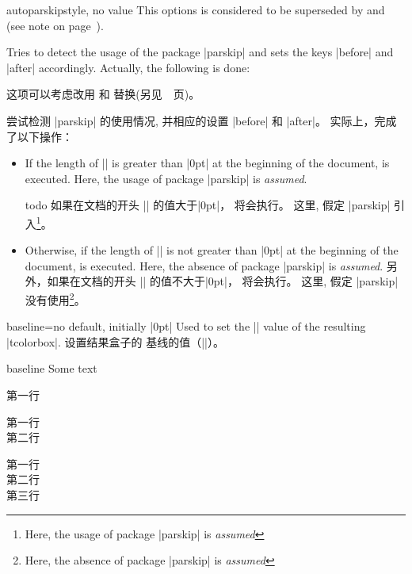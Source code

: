 \begin{docTcbKey}{autoparskip}{}{style, no value}
This options is considered to be superseded by
 and 
(see note on page~\pageref{subsec:surroundings}).\par
Tries to detect the usage of the package |parskip| and sets
the keys |before| and |after| accordingly. Actually, the following is done:

这项可以考虑改用  和  替换(另见~\pageref{subsec:surroundings}~页)。\par
尝试检测 |parskip| 的使用情况, 并相应的设置 |before| 和 |after|。 实际上，完成了以下操作：

\begin{itemize}
\item 
If the length of |\parskip| is greater than |0pt| at the beginning of the document,
 is executed. Here, the usage of package |parskip| is \emph{assumed}.

todo
如果在文档的开头 |\parskip| 的值大于|0pt|，%
 将会执行。 这里, 假定 |parskip| 引入\footnote{Here, the usage of package |parskip| is \emph{assumed}}。

\item 
Otherwise, if the length of |\parskip| is not greater than |0pt| at the beginning of the document,
 is executed. Here, the absence of package |parskip| is \emph{assumed}.
另外，如果在文档的开头 |\parskip| 的值不大于|0pt|，%
 将会执行。 这里, 假定 |parskip| 没有使用\footnote{Here, the absence of package |parskip| is \emph{assumed}}。
\end{itemize}
\end{docTcbKey}





\begin{docTcbKey}{baseline}{=}{no default, initially |0pt|}
Used to set the |\pgfsetbaseline| value of the resulting |tcolorbox|.
设置结果盒子的%
基线的值（|\pgfsetbaseline|）。

\begin{exdispExample}{baseline}
Some text\dotfill
\begin{tcolorbox}[baseline=3mm]
第一行
\end{tcolorbox}
\begin{tcolorbox}[baseline=3mm]
第一行\\第二行
\end{tcolorbox}
\begin{tcolorbox}[baseline=4mm]
第一行\\第二行\\第三行
\end{tcolorbox}
\end{exdispExample}
\end{docTcbKey}




